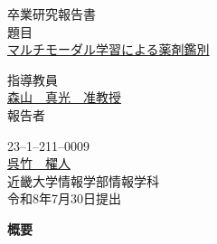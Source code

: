 \documentclass[dvipdfmx]{jsarticle}
\begin{document}
\pagestyle{empty}

\begin{center}
\vspace*{1cm}
\large
{\LARGE 卒業研究報告書}\\
\vspace*{0.8cm}
題目\\
\vspace*{1cm}
{\Huge \underline{マルチモーダル学習による薬剤鑑別}}\\
\vspace{3mm}

\vspace*{3cm}
指導教員\\
\vspace*{0.3cm}
\underline{\LARGE 森山　真光　准教授}\\
\vspace*{3cm}
報告者\\
\vspace*{0.3cm}

{23--1--211--0009}\\
\vspace*{0.3cm}
\underline{\Huge 呉竹　櫂人}\\
\vspace*{0.5cm}
近畿大学情報学部情報学科\\
\vspace*{2cm}
令和8年7月30日提出\\
\end{center}

\newpage
\normalsize

\clearpage
\begin{center}
{\bf \Large 概要}
\end{center}
\end{document}
